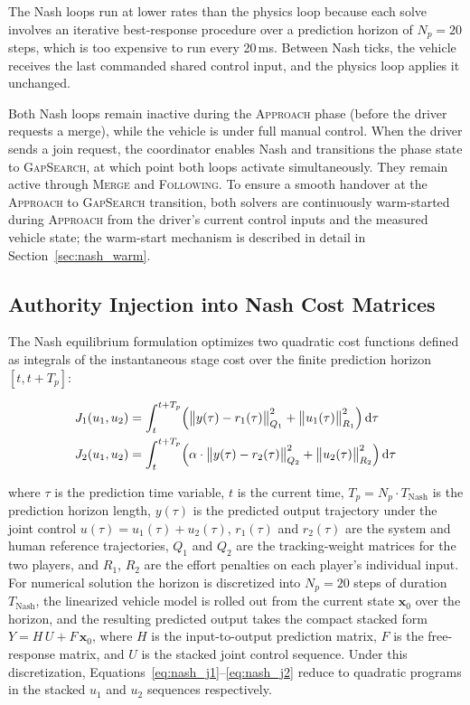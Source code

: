 \documentclass[12pt,a4paper,oneside]{report}
\begin{document}
The Nash loops run at lower rates than the physics loop because each solve involves an iterative best-response procedure over a prediction horizon of $N_p = 20$ steps, which is too expensive to run every 20\,ms. Between Nash ticks, the vehicle receives the last commanded shared control input, and the physics loop applies it unchanged.

Both Nash loops remain inactive during the \textsc{Approach} phase (before the driver requests a merge), while the vehicle is under full manual control. When the driver sends a join request, the coordinator enables Nash and transitions the phase state to \textsc{GapSearch}, at which point both loops activate simultaneously. They remain active through \textsc{Merge} and \textsc{Following}. To ensure a smooth handover at the \textsc{Approach} to \textsc{GapSearch} transition, both solvers are continuously warm-started during \textsc{Approach} from the driver's current control inputs and the measured vehicle state; the warm-start mechanism is described in detail in Section~\ref{sec:nash_warm}.

\subsection{Authority Injection into Nash Cost Matrices}
\label{sec:nash_alpha}

The Nash equilibrium formulation optimizes two quadratic cost functions defined as integrals of the instantaneous stage cost over the finite prediction horizon $[t, t + T_p]$:

\begin{align}
J_1(u_1, u_2) &= \int_{t}^{t+T_p} \Bigl( \bigl\| y(\tau) - r_1(\tau) \bigr\|_{Q_1}^{2} + \bigl\| u_1(\tau) \bigr\|_{R_1}^{2} \Bigr) \, \mathrm{d}\tau \label{eq:nash_j1} \\
J_2(u_1, u_2) &= \int_{t}^{t+T_p} \Bigl( \alpha \cdot \bigl\| y(\tau) - r_2(\tau) \bigr\|_{Q_2}^{2} + \bigl\| u_2(\tau) \bigr\|_{R_2}^{2} \Bigr) \, \mathrm{d}\tau \label{eq:nash_j2}
\end{align}

where $\tau$ is the prediction time variable, $t$ is the current time, $T_p = N_p \cdot T_{\mathrm{Nash}}$ is the prediction horizon length, $y(\tau)$ is the predicted output trajectory under the joint control $u(\tau) = u_1(\tau) + u_2(\tau)$, $r_1(\tau)$ and $r_2(\tau)$ are the system and human reference trajectories, $Q_1$ and $Q_2$ are the tracking-weight matrices for the two players, and $R_1$, $R_2$ are the effort penalties on each player's individual input. For numerical solution the horizon is discretized into $N_p = 20$ steps of duration $T_{\mathrm{Nash}}$, the linearized vehicle model is rolled out from the current state $\mathbf{x}_0$ over the horizon, and the resulting predicted output takes the compact stacked form $Y = H\,U + F\,\mathbf{x}_0$, where $H$ is the input-to-output prediction matrix, $F$ is the free-response matrix, and $U$ is the stacked joint control sequence. Under this discretization, Equations~\ref{eq:nash_j1}--\ref{eq:nash_j2} reduce to quadratic programs in the stacked $u_1$ and $u_2$ sequences respectively.
\end{document}
